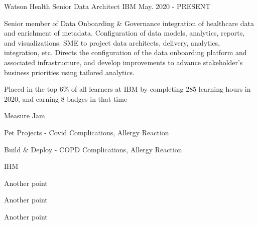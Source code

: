 

\begin{cventries}

  \cventry
    {Watson Health} %
    {Senior Data Architect} %
    {IBM} %
    {May. 2020 - PRESENT} %
    {
      \begin{cvparagraph}
        Senior member of Data Onboarding \& Governance integration of healthcare data and enrichment of metadata. Configuration of data models, analytics, reports, and visualizations. SME to project data architects, delivery, analytics, integration, etc. Directs the configuration of the data onboarding platform and associated infrastructure, and develop improvements to advance stakeholder’s business priorities using tailored analytics.
      \end{cvparagraph}
      \begin{cvitems} %
        \item {Placed in the top 6\% of all learners at IBM by completing 285 learning hours in 2020, and earning 8 badges in that time}
        \item {Measure Jam}
        \item {Pet Projects - Covid Complications, Allergy Reaction}
        \item {Build \& Deploy - COPD Complications, Allergy Reaction}
        \item {IHM}
        \item {Another point}
        \item {Another point}
        \item {Another point}
      \end{cvitems}
    }


\end{cventries}
